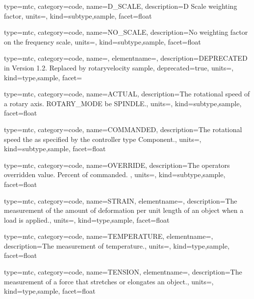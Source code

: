 {
  type=mtc,
  category=code,
  name={D\_SCALE},
  description={D Scale weighting factor},
  units=,
  kind={subtype,sample},
  facet={\gls{float}}
}


{
  type=mtc,
  category=code,
  name={NO\_SCALE},
  description={No weighting factor on the frequency scale},
  units=,
  kind={subtype,sample},
  facet={\gls{float}}
}


{
  type=mtc,
  category=code,
  name={},
  elementname=,
  description={DEPRECATED in Version 1.2.  Replaced by \gls{rotaryvelocity sample}},
  deprecated={true},
  units={},
  kind={type,sample},
  facet={}
}


{
  type=mtc,
  category=code,
  name={ACTUAL},
  description={The rotational speed of a rotary axis.  ROTARY\_MODE \must be SPINDLE.},
  units=,
  kind={subtype,sample},
  facet={\gls{float}}
}


{
  type=mtc,
  category=code,
  name={COMMANDED},
  description={The rotational speed the as specified by the \gls{controller} type Component.},
  units=,
  kind={subtype,sample},
  facet={\gls{float}}
}


{
  type=mtc,
  category=code,
  name={OVERRIDE},
  description={The operators overridden value.  Percent of commanded. },
  units=,
  kind={subtype,sample},
  facet={\gls{float}}
}


{
  type=mtc,
  category=code,
  name={STRAIN},
  elementname=,
  description={The measurement of the amount of deformation per unit length of an object when a load is applied.},
  units=,
  kind={type,sample},
  facet={\gls{float}}
}


{
  type=mtc,
  category=code,
  name={TEMPERATURE},
  elementname=,
  description={The measurement of temperature.},
  units=,
  kind={type,sample},
  facet={\gls{float}}
}


{
  type=mtc,
  category=code,
  name={TENSION},
  elementname=,
  description={The measurement of a force that stretches or elongates an object.},
  units=,
  kind={type,sample},
  facet={\gls{float}}
}


